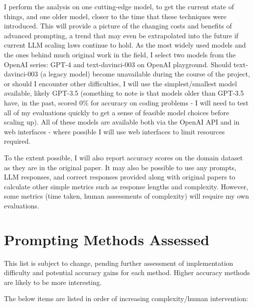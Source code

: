 \documentclass[11pt]{article}
\begin{document}
I perform the analysis on one cutting-edge model, to get the current state of things, and one older model, closer to the time that these techniques were introduced. This will provide a picture of the changing costs and benefits of advanced prompting, a trend that may even be extrapolated into the future if current LLM scaling laws continue to hold. As the most widely used models and the ones behind much original work in the field, I select two models from the OpenAI series: GPT-4 and text-davinci-003 on OpenAI playground. Should text-davinci-003 (a legacy model) become unavailable during the course of the project, or should I encounter other difficulties, I will use the simplest/smallest model available, likely GPT-3.5 (something to note is that models older than GPT-3.5 have, in the past, scored 0\% for accuracy on coding problems - I will need to test all of my evaluations quickly to get a sense of feasible model choices before scaling up). All of these models are available both via the OpenAI API and in web interfaces - where possible I will use web interfaces to limit resources required.

To the extent possible, I will also report accuracy scores on the domain dataset as they are in the original paper. It may also be possible to use any prompts, LLM responses, and correct responses provided along with original papers to calculate other simple metrics such as response lengths and complexity. However, some metrics (time taken, human assessments of complexity) will require my own evaluations.

\section*{Prompting Methods Assessed}

This list is subject to change, pending further assessment of implementation difficulty and potential accuracy gains for each method. Higher accuracy methods are likely to be more interesting.

The below items are listed in order of increasing complexity/human intervention:
\end{document}
